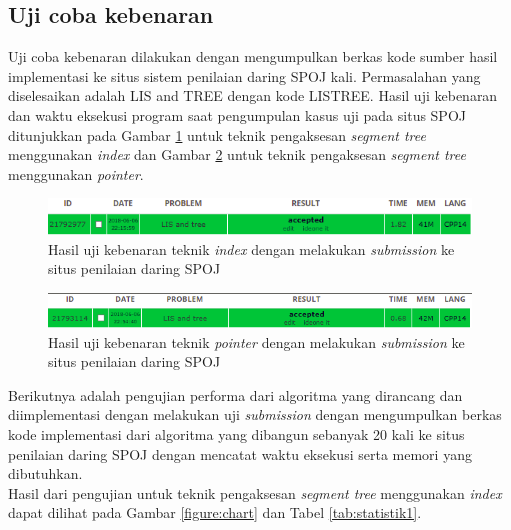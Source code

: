 \documentclass[a4paper]{IEEEtran}
\begin{document}
\subsection{Uji coba kebenaran}
Uji coba kebenaran dilakukan dengan mengumpulkan berkas kode sumber hasil implementasi ke situs sistem penilaian daring SPOJ kali. Permasalahan yang diselesaikan adalah LIS and TREE dengan kode LISTREE. Hasil uji kebenaran dan waktu eksekusi program saat pengumpulan kasus uji pada situs SPOJ ditunjukkan pada Gambar \ref{figure:accindex} untuk teknik pengaksesan \textit{segment tree} menggunakan \textit{index} dan Gambar \ref{figure:accpointer} untuk teknik pengaksesan \textit{segment tree} menggunakan \textit{pointer}.
\begin{figure}[H]
	\centering
	\includegraphics[width=\linewidth]{images/valueacc.png}
	\caption{Hasil uji kebenaran teknik \textit{index} dengan melakukan \textit{submission} ke situs penilaian daring SPOJ}
	\label{figure:accindex}
\end{figure}
\begin{figure}[H]
	\centering
	\includegraphics[width=\linewidth]{images/pointeracc.png}
	\caption{Hasil uji kebenaran teknik \textit{pointer} dengan melakukan \textit{submission} ke situs penilaian daring SPOJ}
	\label{figure:accpointer}
\end{figure}
Berikutnya adalah pengujian performa dari algoritma yang dirancang dan diimplementasi dengan melakukan uji \textit{submission} dengan mengumpulkan berkas kode implementasi dari algoritma yang dibangun sebanyak 20 kali ke situs penilaian daring SPOJ dengan mencatat waktu eksekusi serta memori yang dibutuhkan.\\
Hasil dari pengujian untuk teknik pengaksesan \textit{segment tree} menggunakan \textit{index} dapat dilihat pada Gambar \ref{figure:chart} dan Tabel \ref{tab:statistik1}.
\end{document}
